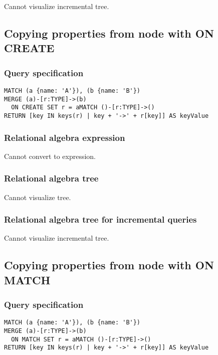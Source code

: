 Cannot visualize incremental tree.

\subsection{Copying properties from node with ON CREATE}

\subsubsection*{Query specification}

\begin{lstlisting}
MATCH (a {name: 'A'}), (b {name: 'B'})
MERGE (a)-[r:TYPE]->(b)
  ON CREATE SET r = aMATCH ()-[r:TYPE]->()
RETURN [key IN keys(r) | key + '->' + r[key]] AS keyValue
\end{lstlisting}

\subsubsection*{Relational algebra expression}

Cannot convert to expression.

\subsubsection*{Relational algebra tree}

Cannot visualize tree.

\subsubsection*{Relational algebra tree for incremental queries}

Cannot visualize incremental tree.

\subsection{Copying properties from node with ON MATCH}

\subsubsection*{Query specification}

\begin{lstlisting}
MATCH (a {name: 'A'}), (b {name: 'B'})
MERGE (a)-[r:TYPE]->(b)
  ON MATCH SET r = aMATCH ()-[r:TYPE]->()
RETURN [key IN keys(r) | key + '->' + r[key]] AS keyValue
\end{lstlisting}

